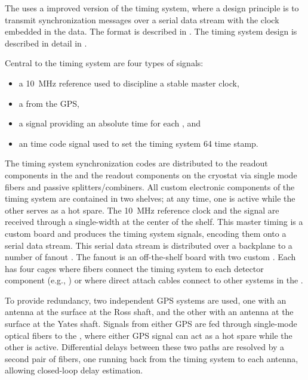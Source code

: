 The   uses a improved version of the  timing
system, where a design principle is to transmit synchronization messages over
a serial data stream with the clock embedded in the data. The format
is described in . The timing system design is
described in detail in .

Central to the timing system are four types of signals:
\begin{itemize}
\item a \SI{10}{\mega\hertz} reference used to discipline a stable master clock,
\item a  from the GPS,
\item a  signal providing an absolute time for each , and
\item an  time code signal
  used to set the timing system \SI{64}{\bit} time stamp.
\end{itemize}

The timing system synchronization codes are distributed to the  readout components in the  and the readout components on the cryostat via single mode fibers and passive splitters/combiners.
All custom electronic components of the timing system are contained in two  shelves; at any time, one is active while the other serves as a hot spare.
The \SI{10}{MHz} reference clock and the  signal are received through a single-width  at the center of the  shelf.
This master timing  is a custom board and produces the timing system signals, encoding them onto a serial data stream.
This serial data stream is distributed over a backplane to a number of fanout .
The fanout  is an off-the-shelf board with two custom .
Each  has four  cages where fibers connect the timing system to each detector component (e.g., ) or where direct attach cables connect to other systems in the .

To provide redundancy, two independent GPS systems are used,
one with an antenna at the surface at the Ross shaft, and the other
with an antenna at the surface at the Yates shaft. Signals from either
GPS are fed through single-mode optical fibers to the , where
either GPS signal can act as a hot spare while the other is active. 
Differential delays between these two paths are resolved by a second pair of 
fibers, one running back from the timing system to each antenna, 
allowing closed-loop delay estimation.



